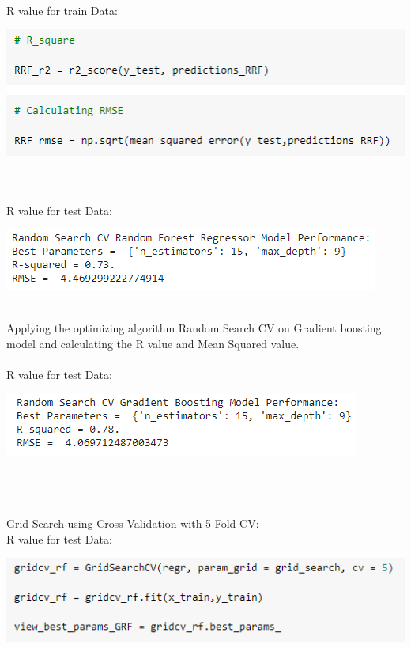 \documentclass[journal,twoside,web]{ieeecolor}
\begin{document}
\\
R value for train Data:
\begin{center}
\includegraphics[scale=0.60]{Picture32.png}
\end{center}
\\
\\
R value for test Data:
\begin{center}
\includegraphics[scale=0.60]{Picture33.png}
\end{center}
\\
Applying the optimizing algorithm Random Search CV on Gradient boosting model and calculating the R value and Mean Squared value.
\\
\\
R value for test Data:
\begin{center}
\includegraphics[scale=0.60]{Picture34.png}
\end{center}
\\
\\
\hspace{}
\\
Grid Search using Cross Validation with 5-Fold CV:
\\
R value for test Data:
\begin{center}
\includegraphics[scale=0.60]{Picture35.png}
\end{center}
\end{document}
